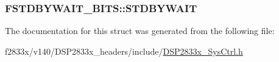 \subsubsection[{S\+T\+D\+B\+Y\+W\+A\+I\+T}]{ F\+S\+T\+D\+B\+Y\+W\+A\+I\+T\+\_\+\+B\+I\+T\+S\+::\+S\+T\+D\+B\+Y\+W\+A\+I\+T}\label{struct_f_s_t_d_b_y_w_a_i_t___b_i_t_s_aa8b04e63dce365a4be147052f0e81966}


The documentation for this struct was generated from the following file\+:\begin{DoxyCompactItemize}
\item 
f2833x/v140/\+D\+S\+P2833x\+\_\+headers/include/\hyperlink{_d_s_p2833x___sys_ctrl_8h}{D\+S\+P2833x\+\_\+\+Sys\+Ctrl.\+h}\end{DoxyCompactItemize}
